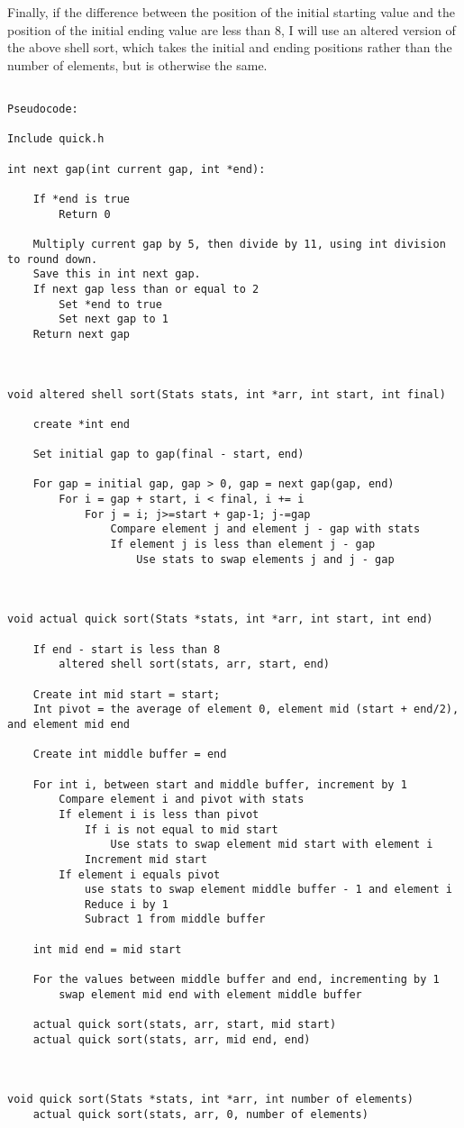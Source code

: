 \documentclass[11pt]{article}
\begin{document}
Finally, if the difference between the position of the initial starting value and the position of the initial ending value are less than 8, I will use an altered version of the above shell sort, which takes the initial and ending positions rather than the number of elements, but is otherwise the same.

\begin{verbatim}

Pseudocode:

Include quick.h

int next gap(int current gap, int *end):

    If *end is true
        Return 0

    Multiply current gap by 5, then divide by 11, using int division to round down.
    Save this in int next gap.
    If next gap less than or equal to 2
        Set *end to true
        Set next gap to 1
    Return next gap



void altered shell sort(Stats stats, int *arr, int start, int final)

    create *int end

    Set initial gap to gap(final - start, end)

    For gap = initial gap, gap > 0, gap = next gap(gap, end)
        For i = gap + start, i < final, i += i
            For j = i; j>=start + gap-1; j-=gap
                Compare element j and element j - gap with stats
                If element j is less than element j - gap
                    Use stats to swap elements j and j - gap



void actual quick sort(Stats *stats, int *arr, int start, int end)

    If end - start is less than 8
        altered shell sort(stats, arr, start, end)

    Create int mid start = start;
    Int pivot = the average of element 0, element mid (start + end/2), and element mid end

    Create int middle buffer = end

    For int i, between start and middle buffer, increment by 1
        Compare element i and pivot with stats
        If element i is less than pivot
            If i is not equal to mid start
                Use stats to swap element mid start with element i
            Increment mid start
        If element i equals pivot
            use stats to swap element middle buffer - 1 and element i
            Reduce i by 1
            Subract 1 from middle buffer

    int mid end = mid start

    For the values between middle buffer and end, incrementing by 1
        swap element mid end with element middle buffer

    actual quick sort(stats, arr, start, mid start)
    actual quick sort(stats, arr, mid end, end)



void quick sort(Stats *stats, int *arr, int number of elements)
    actual quick sort(stats, arr, 0, number of elements)

\end{verbatim}
\end{document}
